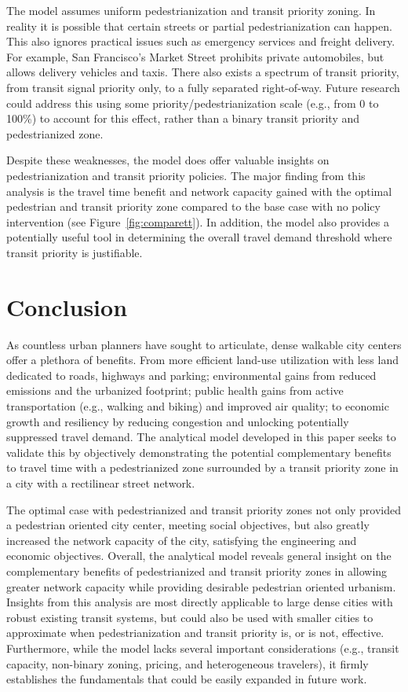 \documentclass{elsarticle}\usepackage[]{graphicx}\usepackage[]{color}
\begin{document}
The model assumes uniform pedestrianization and transit priority zoning. In reality it is possible that certain streets or partial pedestrianization can happen. This also ignores practical issues such as emergency services and freight delivery. For example, San Francisco's Market Street prohibits private automobiles, but allows delivery vehicles and taxis. There also exists a spectrum of transit priority, from transit signal priority only, to a fully separated right-of-way. Future research could address this using some priority/pedestrianization scale (e.g., from 0 to 100\%) to account for this effect, rather than a binary transit priority and pedestrianized zone.

Despite these weaknesses, the model does offer valuable insights on pedestrianization and transit priority policies. The major finding from this analysis is the travel time benefit and network capacity gained with the optimal pedestrian and transit priority zone compared to the base case with no policy intervention (see Figure~\ref{fig:comparett}). In addition, the model also provides a potentially useful tool in determining the overall travel demand threshold where transit priority is justifiable. 

\section{Conclusion}
As countless urban planners have sought to articulate, dense walkable city centers offer a plethora of benefits. From more efficient land-use utilization with less land dedicated to roads, highways and parking; environmental gains from reduced emissions and the urbanized footprint; public health gains from active transportation (e.g., walking and biking) and improved air quality; to economic growth and resiliency by reducing congestion and unlocking potentially suppressed travel demand. The analytical model developed in this paper seeks to validate this by objectively demonstrating the potential complementary benefits to travel time with a pedestrianized zone surrounded by a transit priority zone in a city with a rectilinear street network. 

The optimal case with pedestrianized and transit priority zones not only provided a pedestrian oriented city center, meeting social objectives, but also greatly increased the network capacity of the city, satisfying the engineering and economic objectives. Overall, the analytical model reveals general insight on the complementary benefits of pedestrianized and transit priority zones in allowing greater network capacity while providing desirable pedestrian oriented urbanism. Insights from this analysis are most directly applicable to large dense cities with robust existing transit systems, but could also be used with smaller cities to approximate when pedestrianization and transit priority is, or is not, effective. Furthermore, while the model lacks several important considerations (e.g., transit capacity, non-binary zoning, pricing, and heterogeneous travelers), it firmly establishes the fundamentals that could be easily expanded in future work.
\end{document}
